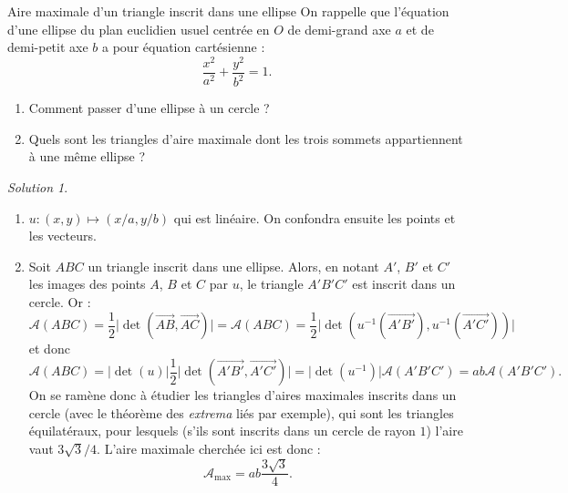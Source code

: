 \documentclass[french]{book}
\newcommand{\inv}{^{-1}}
\theoremstyle{definition}
\theoremstyle{remark}
\newtheorem*{sol}{Solution}
\begin{document}
\begin{exo}[2]{Aire maximale d'un triangle inscrit dans une ellipse}
	On rappelle que l'équation d'une ellipse du plan euclidien usuel centrée en $O$ de demi-grand axe $a$ et de demi-petit axe $b$ a pour équation cartésienne :
	$$\frac{x^2}{a^2}+\frac{y^2}{b^2}=1.$$
	\begin{enumerate}
		\item Comment passer d'une ellipse à un cercle ?
		\item Quels sont les triangles d'aire maximale dont les trois sommets appartiennent à une même ellipse ?
	\end{enumerate}
\end{exo}
\begin{sol}
	\begin{enumerate}
		\item $u:(x,y)\mapsto (x/a,y/b)$ qui est linéaire. On confondra ensuite les points et les vecteurs.
		\item Soit $ABC$ un triangle inscrit dans une ellipse. Alors, en notant $A'$, $B'$ et $C'$ les images des points $A$, $B$ et $C$ par $u$, le triangle $A'B'C'$ est inscrit dans un cercle. Or :
			$$\mathcal{A}(ABC)=\frac{1}{2}\lvert\det(\overrightarrow{AB},\overrightarrow{AC})\rvert=\mathcal{A}(ABC)=\frac{1}{2}\lvert\det(u\inv(\overrightarrow{A'B'}),u\inv(\overrightarrow{A'C'}))\rvert$$
			et donc $$\mathcal{A}(ABC)=\lvert \det(u)\rvert\frac{1}{2}\lvert\det(\overrightarrow{A'B'},\overrightarrow{A'C'})\rvert=\lvert\det(u\inv)\rvert\mathcal{A}(A'B'C')=ab\mathcal{A}(A'B'C').$$
		On se ramène donc à étudier les triangles d'aires maximales inscrits dans un cercle (avec le théorème des \textit{extrema} liés par exemple), qui sont les triangles équilatéraux, pour lesquels (s'ils sont inscrits dans un cercle de rayon $1$) l'aire vaut $3\sqrt{3}/4$. L'aire maximale cherchée ici est donc :
		$$\mathcal{A}_{\text{max}}=ab\frac{3\sqrt{3}}{4}.$$
	\end{enumerate}
\end{sol}
\end{document}
